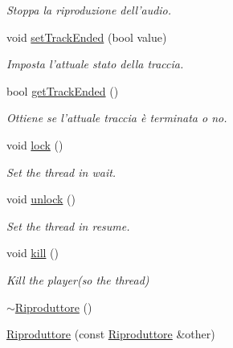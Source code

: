 \begin{DoxyCompactItemize}
\begin{DoxyCompactList}\small\item\em \-Stoppa la riproduzione dell'audio. \end{DoxyCompactList}\item 
void \hyperlink{classRiproduttore_aafc3cf55f8a95cfc5e3779294184db8b}{set\-Track\-Ended} (bool value)
\begin{DoxyCompactList}\small\item\em \-Imposta l'attuale stato della traccia. \end{DoxyCompactList}\item 
\hypertarget{classRiproduttore_abf360eff47ce41b498b6d66672225929}{bool \hyperlink{classRiproduttore_abf360eff47ce41b498b6d66672225929}{get\-Track\-Ended} ()}\label{classRiproduttore_abf360eff47ce41b498b6d66672225929}

\begin{DoxyCompactList}\small\item\em \-Ottiene se l'attuale traccia è terminata o no. \end{DoxyCompactList}\item 
\hypertarget{classRiproduttore_a87c1d5e97b54d0d4abbd5465adeb7c10}{void \hyperlink{classRiproduttore_a87c1d5e97b54d0d4abbd5465adeb7c10}{lock} ()}\label{classRiproduttore_a87c1d5e97b54d0d4abbd5465adeb7c10}

\begin{DoxyCompactList}\small\item\em \-Set the thread in wait. \end{DoxyCompactList}\item 
\hypertarget{classRiproduttore_a58878af288d0625f8971a4b3dab8ccf6}{void \hyperlink{classRiproduttore_a58878af288d0625f8971a4b3dab8ccf6}{unlock} ()}\label{classRiproduttore_a58878af288d0625f8971a4b3dab8ccf6}

\begin{DoxyCompactList}\small\item\em \-Set the thread in resume. \end{DoxyCompactList}\item 
\hypertarget{classRiproduttore_a084180b417949e5e1c13443711ed9215}{void \hyperlink{classRiproduttore_a084180b417949e5e1c13443711ed9215}{kill} ()}\label{classRiproduttore_a084180b417949e5e1c13443711ed9215}

\begin{DoxyCompactList}\small\item\em \-Kill the player(so the thread) \end{DoxyCompactList}\item 
\hyperlink{classRiproduttore_af125f230183970d506e616bf444e3771}{$\sim$\-Riproduttore} ()
\item 
\hypertarget{classRiproduttore_ae4e04ee770a1f551abfe57dcd8a3cfac}{\hyperlink{classRiproduttore_ae4e04ee770a1f551abfe57dcd8a3cfac}{\-Riproduttore} (const \hyperlink{classRiproduttore}{\-Riproduttore} \&other)}\label{classRiproduttore_ae4e04ee770a1f551abfe57dcd8a3cfac}


\end{DoxyCompactItemize}
